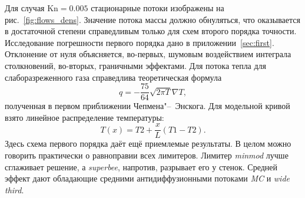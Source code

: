 \documentclass[a4paper,10pt]{article}
\newcommand{\Kn}{\mathrm{Kn}}
\begin{document}
Для случая \(\Kn=0.005\) стационарные потоки изображены на рис.~\ref{fig:flows_dens}.
Значение потока массы должно обнуляться, что оказывается в достаточной степени справедливым только для схем второго порядка точности.
Исследование погрешности первого порядка дано в приложении~\ref{sec:first}. 
Отклонение от нуля объясняется, во-первых, шумовым воздействием интеграла столкновений, во-вторых, граничными эффектами.
Для потока тепла для слаборазреженного газа справедлива теоретическая формула
\begin{equation}
 q=-\frac{75}{64}\sqrt{2\pi T}\nabla T,
\label{eq:heat_cond}
\end{equation}
полученная в первом приближении Чепмена"--~Энскога.
Для модельной кривой взято линейное распределение температуры:
\[ T(x)=T2+\frac{x}{L}(T1-T2).\]
Здесь схема первого порядка даёт ещё приемлемые результаты.
В целом можно говорить практически о равноправии всех лимитеров.
Лимитер \textit{minmod} лучше сглаживает решение, а \textit{superbee}, напротив, разрывает его у стенок.
Средней эффект дают обладающие средними антидиффузионными потоками \textit{MC} и \textit{wide third}.
\end{document}
